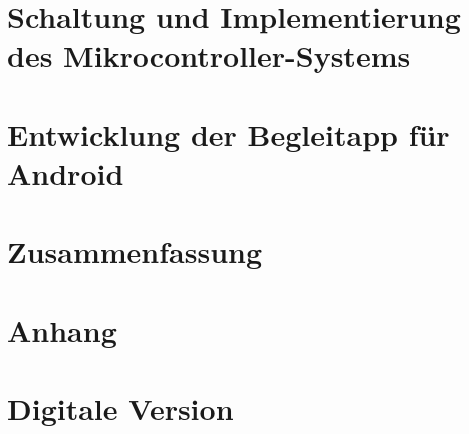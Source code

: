 \documentclass[a4paper, 11pt, titlepage, bibliography=totocnumbered]{scrartcl}
\begin{document}
\newpage
\section{Schaltung und Implementierung des Mikrocontroller-Systems}


\newpage
\section{Entwicklung der Begleitapp für Android}


\newpage
\section{Zusammenfassung}


\newpage


\newpage
\section{Anhang}


\newpage
\section*{Digitale Version}
\vspace{2cm}
\hspace{0.5cm}
\end{document}
